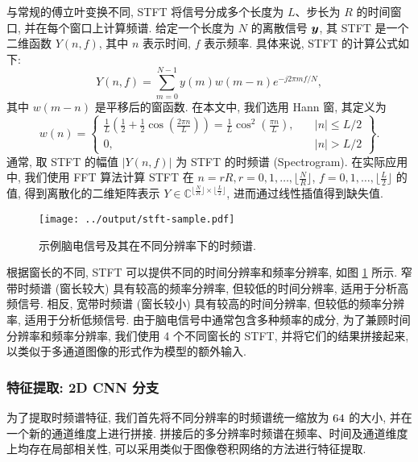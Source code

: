 \documentclass[12pt,a4paper]{article}
\begin{document}
与常规的傅立叶变换不同, STFT 将信号分成多个长度为 $L$、步长为 $R$ 的时间窗口, 并在每个窗口上计算频谱. 给定一个长度为 $N$ 的离散信号 ${\bm{y}}$, 其 STFT 是一个二维函数 $Y(n, f)$, 其中 $n$ 表示时间, $f$ 表示频率. 具体来说, STFT 的计算公式如下:
\begin{equation}
    Y(n, f) = \sum_{m=0}^{N-1} y(m) w(m - n) e^{-j2\pi mf/N},
\end{equation}
其中 $w(m - n)$ 是平移后的窗函数. 在本文中, 我们选用 Hann 窗, 其定义为
\begin{equation}
    w(n) = \left\{{\begin{array}{ccl}{\tfrac {1}{L}}\left({\tfrac {1}{2}}+{\tfrac {1}{2}}\cos \left({\frac {2\pi n}{L}}\right)\right)={\tfrac {1}{L}}\cos ^{2}\left({\frac {\pi n}{L}}\right),\quad &\left|n\right|\leq L/2\\0,\quad &\left|n\right|>L/2\end{array}}\right\}.
\end{equation}
通常, 取 STFT 的幅值 $|Y(n, f)|$ 为 STFT 的时频谱 (Spectrogram). 在实际应用中, 我们使用 FFT 算法计算 STFT 在 $n=rR, r=0,1,\ldots,\lfloor \frac{N}{R} \rfloor$, $f = 0, 1, \ldots, \lfloor \frac{L}{2} \rfloor$ 的值, 得到离散化的二维矩阵表示 $Y \in \mathbb{C}^{\lfloor \frac{N}{R} \rfloor \times \lfloor \frac{L}{2} \rfloor}$, 进而通过线性插值得到缺失值.

\begin{figure}[h]
    \centering
    \texttt{[image: ../output/stft-sample.pdf]}
    \caption{示例脑电信号及其在不同分辨率下的时频谱.}\label{fig:stft-sample}
\end{figure}

根据窗长的不同, STFT 可以提供不同的时间分辨率和频率分辨率, 如图 \ref{fig:stft-sample} 所示. 窄带时频谱 (窗长较大) 具有较高的频率分辨率, 但较低的时间分辨率, 适用于分析高频信号. 相反, 宽带时频谱 (窗长较小) 具有较高的时间分辨率, 但较低的频率分辨率, 适用于分析低频信号. 由于脑电信号中通常包含多种频率的成分, 为了兼顾时间分辨率和频率分辨率, 我们使用 4 个不同窗长的 STFT, 并将它们的结果拼接起来, 以类似于多通道图像的形式作为模型的额外输入.

\subsubsection{特征提取: 2D CNN 分支}

为了提取时频谱特征, 我们首先将不同分辨率的时频谱统一缩放为 $64\time 64$ 的大小, 并在一个新的通道维度上进行拼接. 拼接后的多分辨率时频谱在频率、时间及通道维度上均存在局部相关性, 可以采用类似于图像卷积网络的方法进行特征提取.
\end{document}
